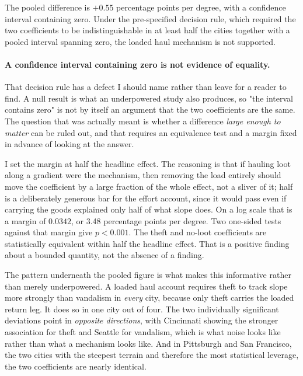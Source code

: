 \documentclass[12pt,letterpaper]{article}
\begin{document}
The pooled difference is $+0.55$ percentage points per degree, with a confidence
interval containing zero. Under the pre-specified decision rule, which required the
two coefficients to be indistinguishable in at least half the cities together with a
pooled interval spanning zero, the loaded haul mechanism is not supported.

\paragraph{A confidence interval containing zero is not evidence of equality.} That
decision rule has a defect I should name rather than leave for a reader to find. A
null result is what an underpowered study also produces, so "the interval contains
zero" is not by itself an argument that the two coefficients are the same. The
question that was actually meant is whether a difference \emph{large enough to
matter} can be ruled out, and that requires an equivalence test and a margin fixed
in advance of looking at the answer.

I set the margin at half the headline effect. The reasoning is that if hauling loot
along a gradient were the mechanism, then removing the load entirely should move the
coefficient by a large fraction of the whole effect, not a sliver of it; half is a
deliberately generous bar for the effort account, since it would pass even if
carrying the goods explained only half of what slope does. On a log scale that is a
margin of $0.0342$, or 3.48 percentage points per degree. Two one-sided tests
against that margin give $p < 0.001$. The theft and no-loot coefficients are
statistically equivalent within half the headline effect. That is a positive
finding about a bounded quantity, not the absence of a finding.

The pattern underneath the pooled figure is what makes this informative rather than
merely underpowered. A loaded haul account requires theft to track slope more
strongly than vandalism in \emph{every} city, because only theft carries the loaded
return leg. It does so in one city out of four. The two individually significant
deviations point in \emph{opposite directions}, with Cincinnati showing the stronger
association for theft and Seattle for vandalism, which is what noise looks like
rather than what a mechanism looks like. And in Pittsburgh and San Francisco, the two
cities with the steepest terrain and therefore the most statistical leverage, the two
coefficients are nearly identical.
\end{document}

